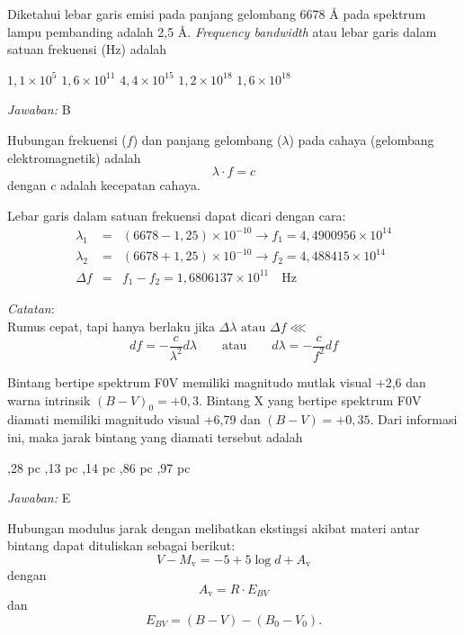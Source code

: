 \documentclass[11pt,fleqn]{exam}
\begin{document}
\begin{questions}
\vspace{0.5cm}
\question Diketahui lebar garis emisi pada panjang gelombang 6678 \AA{} pada spektrum lampu pembanding adalah 2,5 \AA. \textit{Frequency bandwidth} atau lebar garis dalam satuan frekuensi (Hz) adalah
\begin{choices}
\choice $1,1 \times 10^5$
\choice $1,6 \times 10^{11}$
\choice $4,4 \times 10^{15}$
\choice $1,2 \times 10^{18}$
\choice $1,6 \times 10^{18}$
\end{choices}


\textit{Jawaban: }B

Hubungan frekuensi ($f$) dan panjang gelombang ($\lambda$) pada cahaya (gelombang elektromagnetik) adalah
$$\lambda \cdot f = c$$
dengan $c$ adalah kecepatan cahaya.

Lebar garis dalam satuan frekuensi dapat dicari dengan cara:
\begin{eqnarray*}
\lambda_1 &=& (6678 - 1,25) \times 10^{-10} \longrightarrow f_1 = 4,4900956 \times 10^{14} \\
\lambda_2 &=& (6678 + 1,25) \times 10^{-10} \longrightarrow f_2 = 4,488415 \times 10^{14} \\
\Delta f &=& f_1 - f_2 = 1,6806137 \times 10^{11} \quad \text{Hz}
\end{eqnarray*}

\textit{Catatan}:\\
Rumus cepat, tapi hanya berlaku jika $\Delta \lambda \text{  atau  } \Delta f \lll$ 
\begin{equation*}
df = -\frac{c}{\lambda^{2}} d\lambda \qquad \text{atau} \qquad d\lambda = -\frac{c}{f^{2}} df
\end{equation*}


\vspace{0.5cm}
\question Bintang bertipe spektrum F0V memiliki magnitudo mutlak visual +2,6 dan warna intrinsik $(B-V)_0 = +0,3$. Bintang X yang bertipe spektrum F0V diamati memiliki magnitudo visual +6,79 dan $(B - V) = +0,35$. Dari informasi ini, maka jarak bintang yang diamati tersebut adalah
\begin{choices}
,28 pc
,13 pc
,14 pc
,86 pc
,97 pc
\end{choices}


\textit{Jawaban: }E

Hubungan modulus jarak dengan melibatkan ekstingsi akibat materi antar bintang dapat dituliskan sebagai berikut:
$$V - M_{\text{v}} = -5 + 5\log{d} + A_{\text{v}}$$
dengan 
$$A_\text{v} = R \cdot E_{BV}$$
dan 
$$E_{BV} = (B - V) - (B_0 - V_0).$$


\end{questions}
\end{document}

